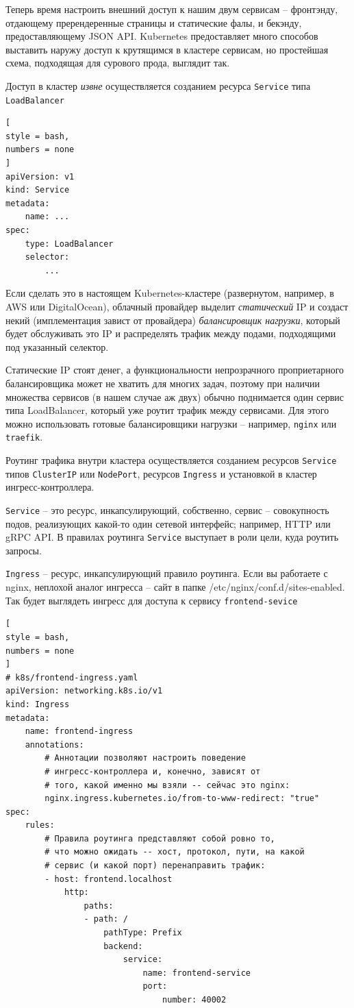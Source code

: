 \documentclass[%
	11pt,
	a4paper,
	utf8,
		]{article}
\begin{document}
Теперь время настроить внешний доступ к нашим двум сервисам -- фронтэнду, отдающему пререндеренные страницы и статические фалы, и бекэнду, предоставляющему JSON API. Kubernetes предоставляет много способов выставить наружу доступ к крутящимся в кластере сервисам, но простейшая схема, подходящая для сурового прода, выглядит так.

Доступ в кластер \emph{извне} осуществляется созданием ресурса \verb*|Service| типа \verb*|LoadBalancer|
\begin{lstlisting}[
style = bash,
numbers = none
]
apiVersion: v1
kind: Service
metadata:
    name: ...
spec:
    type: LoadBalancer
    selector:
        ...
\end{lstlisting}

{\color{blue}
Если сделать это в настоящем Kubernetes-кластере (развернутом, например, в AWS или DigitalOcean), облачный провайдер выделит \emph{статический} IP и создаст некий (имплементация завист от провайдера) \emph{балансировщик нагрузки}, который будет обслуживать это IP и распределять трафик между подами, подходящими под указанный селектор.}

Статические IP стоят денег, а функциональности непрозрачного проприетарного балансировщика может не хватить для многих задач, поэтому при наличии множества сервисов (в нашем случае аж двух) обычно поднимается один сервис типа LoadBalancer, который уже роутит трафик между сервисами. Для этого можно использовать готовые балансировщики нагрузки -- например, \verb*|nginx| или \verb*|traefik|.

Роутинг трафика внутри кластера осуществляется созданием ресурсов \verb*|Service| типов \verb*|ClusterIP| или \verb*|NodePort|, ресурсов \verb*|Ingress| и установкой в кластер ингресс-контроллера.

\verb*|Service| -- это ресурс, инкапсулирующий, собственно, сервис -- совокупность подов, реализующих какой-то один сетевой интерфейс; например, HTTP или gRPC API. В правилах роутинга \verb*|Service| выступает в роли цели, куда роутить запросы.

\verb*|Ingress| -- ресурс, инкапсулирующий правило роутинга. Если вы работаете с nginx, неплохой аналог ингресса -- сайт в папке /etc/nginx/conf.d/sites-enabled. Так будет выглядеть ингресс для доступа к сервису \verb*|frontend-sevice|
\begin{lstlisting}[
style = bash,
numbers = none
]
# k8s/frontend-ingress.yaml
apiVersion: networking.k8s.io/v1
kind: Ingress
metadata:
	name: frontend-ingress
	annotations:
		# Аннотации позволяют настроить поведение
		# ингресс-контроллера и, конечно, зависят от
		# того, какой именно мы взяли -- сейчас это nginx:
		nginx.ingress.kubernetes.io/from-to-www-redirect: "true"
spec:
	rules:
		# Правила роутинга представляют собой ровно то,
		# что можно ожидать -- хост, протокол, пути, на какой 
		# сервис (и какой порт) перенаправить трафик: 
		- host: frontend.localhost
			http:
				paths:
				- path: /
					pathType: Prefix
					backend:
						service:
							name: frontend-service
							port:
								number: 40002
\end{lstlisting}
\end{document}
